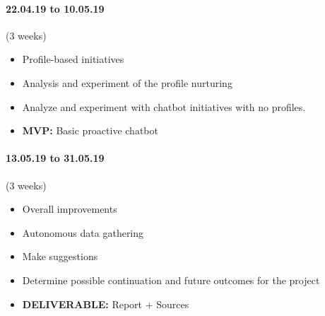 \paragraph{22.04.19 to 10.05.19} (3 weeks)
\begin{itemize}
	\item Profile-based initiatives
	\item Analysis and experiment of the profile nurturing 
	\item Analyze and experiment with chatbot initiatives with no profiles.
	\item \textbf{MVP:} Basic proactive chatbot
\end{itemize}

\paragraph{13.05.19 to 31.05.19} (3 weeks)
\begin{itemize}
	\item Overall improvements
	\item Autonomous data gathering
	\item Make suggestions
	\item Determine possible continuation and future outcomes for the project
	\item \textbf{DELIVERABLE:} Report + Sources
\end{itemize}
